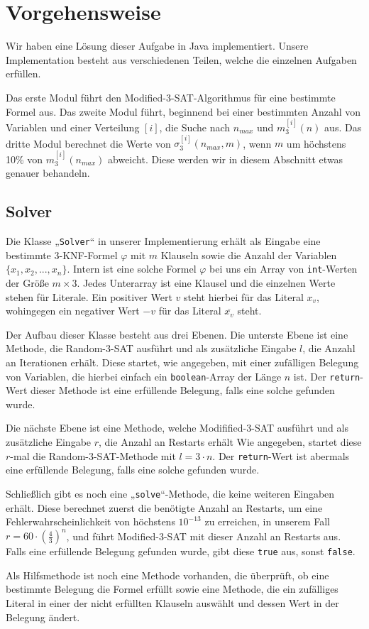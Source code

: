 \documentclass[maincolor=black]{exercise}
\newcommand{\anf}[1]{„#1“}
\newcommand{\non}[1]{\overline{#1}}
\begin{document}
\section*{Vorgehensweise}
Wir haben eine Lösung dieser Aufgabe in Java implementiert. Unsere Implementation besteht aus verschiedenen Teilen, welche die einzelnen Aufgaben erfüllen.\par
Das erste Modul führt den Modified-3-SAT-Algorithmus für eine bestimmte Formel aus. Das zweite Modul führt, beginnend bei einer bestimmten Anzahl von Variablen und einer Verteilung $[i]$, die Suche nach $n_{max}$ und $m_3^{[i]}(n)$ aus. Das dritte Modul berechnet die Werte von $\sigma_3^{[i]}(n_{max},m)$, wenn $m$ um höchstens 10\% von $m_3^{[i]}(n_{max})$ abweicht. Diese werden wir in diesem Abschnitt etwas genauer behandeln.

\subsection{Solver}
Die Klasse \anf{\texttt{Solver}} in unserer Implementierung erhält als Eingabe eine bestimmte 3-KNF-Formel $\varphi$ mit $m$ Klauseln sowie die Anzahl der Variablen $\{x_1,x_2,...,x_n\}$. Intern ist eine solche Formel $\varphi$ bei uns ein Array von \texttt{int}-Werten der Größe $m \times 3$. Jedes Unterarray ist eine Klausel und die einzelnen Werte stehen für Literale. Ein positiver Wert $v$ steht hierbei für das Literal $x_v$, wohingegen ein negativer Wert $-v$ für das Literal $\non{x_v}$ steht.\par
Der Aufbau dieser Klasse besteht aus drei Ebenen. Die unterste Ebene ist eine Methode, die Random-3-SAT ausführt und als zusätzliche Eingabe $l$, die Anzahl an Iterationen erhält. Diese startet, wie angegeben, mit einer zufälligen Belegung von Variablen, die hierbei einfach ein \texttt{boolean}-Array der Länge $n$ ist. Der \texttt{return}-Wert dieser Methode ist eine erfüllende Belegung, falls eine solche gefunden wurde.\par
Die nächste Ebene ist eine Methode, welche Modifified-3-SAT ausführt und als zusätzliche Eingabe $r$, die Anzahl an Restarts erhält Wie angegeben, startet diese $r$-mal die Random-3-SAT-Methode mit $l = 3\cdot n$. Der \texttt{return}-Wert ist abermals eine erfüllende Belegung, falls eine solche gefunden wurde.\par
Schließlich gibt es noch eine \anf{\texttt{solve}}-Methode, die keine weiteren Eingaben erhält. Diese berechnet zuerst die benötigte Anzahl an Restarts, um eine Fehlerwahrscheinlichkeit von höchstens $10^{-13}$ zu erreichen, in unserem Fall $r = 60 \cdot \left(\frac{4}{3}\right)^n$, und führt Modified-3-SAT mit dieser Anzahl an Restarts aus. Falls eine erfüllende Belegung gefunden wurde, gibt diese \texttt{true} aus, sonst \texttt{false}.\par
Als Hilfsmethode ist noch eine Methode vorhanden, die überprüft, ob eine bestimmte Belegung die Formel erfüllt sowie eine Methode, die ein zufälliges Literal in einer der nicht erfüllten Klauseln auswählt und dessen Wert in der Belegung ändert.
\end{document}
